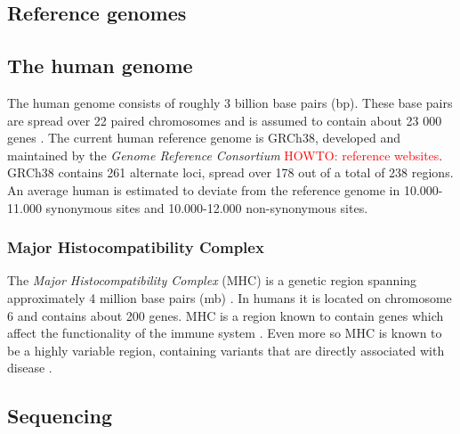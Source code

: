 \documentclass[thesis.tex]{subfiles}
\begin{document}
\subsection{Reference genomes}
\subsection{The human genome}
The human genome consists of roughly 3 billion base pairs (bp). These base pairs are spread over 22 paired chromosomes and is assumed to contain about 23 000 genes \cite{introduction_to_genomics}. The current human reference genome is GRCh38, developed and maintained by the \textit{Genome Reference Consortium} \textcolor{red}{HOWTO: reference websites}. GRCh38 contains 261 alternate loci, spread over 178 out of a total of 238 regions. An average human is estimated to deviate from the reference genome in 10.000-11.000 synonymous sites and 10.000-12.000 non-synonymous sites.
\subsubsection{Major Histocompatibility Complex}
The \textit{Major Histocompatibility Complex} (MHC) is a genetic region spanning approximately 4 million base pairs (mb) \cite{immunobiology_the_immune_system_in_health_and_disease}. In humans it is located on chromosome 6 and contains about 200 genes. MHC is a region known to contain genes which affect the functionality of the immune system \cite{the_importance_of_immune_gene_variability_in_evolutionary_ecology_and_conservation}. Even more so MHC is known to be a highly variable region, containing variants that are directly associated with disease \cite{variation_analysis_and_gene_annotation_of_eight_mhc_haplotypes}.
\subsection{Sequencing}
\end{document}
